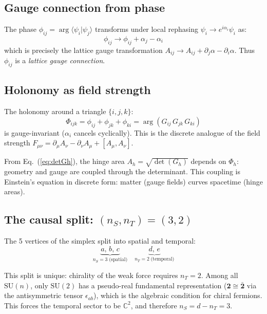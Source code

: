 \subsection{Gauge connection from phase}
\label{sec:gauge_connection}

The phase $\phi_{ij} = \arg\langle\psi_i|\psi_j\rangle$ transforms under local rephasing $\psi_i \to e^{i\alpha_i}\psi_i$ as:
\begin{equation}
\phi_{ij} \to \phi_{ij} + \alpha_j - \alpha_i
\end{equation}
which is precisely the lattice gauge transformation $A_{ij} \to A_{ij} + \partial_j\alpha - \partial_i\alpha$. Thus $\phi_{ij}$ is a \emph{lattice gauge connection}.

\subsection{Holonomy as field strength}
\label{sec:holonomy}

The holonomy around a triangle $\{i, j, k\}$:
\begin{equation}
\Phi_{ijk} = \phi_{ij} + \phi_{jk} + \phi_{ki} = \arg(G_{ij}\,G_{jk}\,G_{ki})
\end{equation}
is gauge-invariant ($\alpha_i$ cancels cyclically). This is the discrete analogue of the field strength $F_{\mu\nu} = \partial_\mu A_\nu - \partial_\nu A_\mu + [A_\mu, A_\nu]$.

From Eq.~(\ref{eq:detGh}), the hinge area $A_h = \sqrt{\det(G_h)}$ depends on $\Phi_h$: geometry and gauge are coupled through the determinant. This coupling is Einstein's equation in discrete form: matter (gauge fields) curves spacetime (hinge areas).

\subsection{The causal split: $(n_S, n_T) = (3, 2)$}

The 5 vertices of the simplex split into spatial and temporal:
\begin{equation}
\underbrace{a,\,b,\,c}_{n_S = 3\;\text{(spatial)}} \quad \underbrace{d,\,e}_{n_T = 2\;\text{(temporal)}}
\end{equation}

This split is unique: chirality of the weak force requires $n_T = 2$. Among all $\text{SU}(n)$, only $\text{SU}(2)$ has a pseudo-real fundamental representation ($\mathbf{2} \cong \bar{\mathbf{2}}$ via the antisymmetric tensor $\epsilon_{ab}$), which is the algebraic condition for chiral fermions. This forces the temporal sector to be $\mathbb{C}^2$, and therefore $n_S = d - n_T = 3$.

